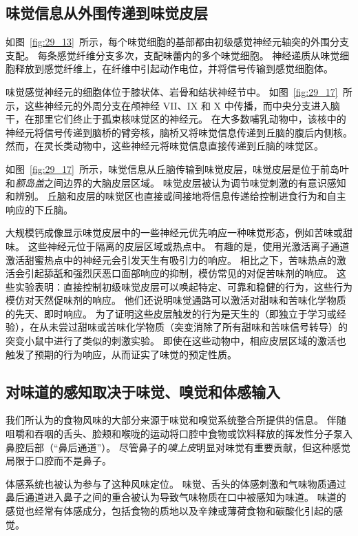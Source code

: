 \subsection{味觉信息从外围传递到味觉皮层}

如图~\ref{fig:29_13}~所示，每个味觉细胞的基部都由初级感觉神经元轴突的外围分支支配。
每条感觉纤维分支多次，支配味蕾内的多个味觉细胞。
神经递质从味觉细胞释放到感觉纤维上，在纤维中引起动作电位，并将信号传输到感觉细胞体。


味觉感觉神经元的细胞体位于膝状体、岩骨和结状神经节中。
如图~\ref{fig:29_17}~所示，这些神经元的外周分支在颅神经 VII、IX 和 X 中传播，而中央分支进入脑干，在那里它们终止于孤束核味觉区的神经元。
在大多数哺乳动物中，该核中的神经元将信号传递到脑桥的臂旁核，脑桥又将味觉信息传递到丘脑的腹后内侧核。 
然而，在灵长类动物中，这些神经元将味觉信息直接传递到丘脑的味觉区。


如图~\ref{fig:29_17}~所示，味觉信息从丘脑传输到味觉皮层，味觉皮层是位于前岛叶和\textit{额岛盖}之间边界的大脑皮层区域。
味觉皮层被认为调节味觉刺激的有意识感知和辨别。
丘脑和皮层的味觉区也直接或间接地将信息传递给控制进食行为和自主响应的下丘脑。


大规模钙成像显示味觉皮层中的一些神经元优先响应一种味觉形态，例如苦味或甜味。
这些神经元位于隔离的皮层区域或热点中。
有趣的是，使用光激活离子通道激活甜蜜热点中的神经元会引发天生有吸引力的响应。
相比之下，苦味热点的激活会引起舔舐和强烈厌恶口面部响应的抑制，模仿常见的对促苦味剂的响应。
这些实验表明：直接控制初级味觉皮层可以唤起特定、可靠和稳健的行为，这些行为模仿对天然促味剂的响应。
他们还说明味觉通路可以激活对甜味和苦味化学物质的先天、即时响应。
为了证明这些皮层触发的行为是天生的（即独立于学习或经验），在从未尝过甜味或苦味化学物质（突变消除了所有甜味和苦味信号转导）的突变小鼠中进行了类似的刺激实验。
即使在这些动物中，相应皮层区域的激活也触发了预期的行为响应，从而证实了味觉的预定性质。



\subsection{对味道的感知取决于味觉、嗅觉和体感输入}

我们所认为的食物风味的大部分来源于味觉和嗅觉系统整合所提供的信息。
伴随咀嚼和吞咽的舌头、脸颊和喉咙的运动将口腔中食物或饮料释放的挥发性分子泵入鼻腔后部（“鼻后通道”）。 
尽管鼻子的\textit{嗅上皮}明显对味觉有重要贡献，但这种感觉局限于口腔而不是鼻子。


体感系统也被认为参与了这种风味定位。
味觉、舌头的体感刺激和气味物质通过鼻后通道进入鼻子之间的重合被认为导致气味物质在口中被感知为味道。
味道的感觉也经常有体感成分，包括食物的质地以及辛辣或薄荷食物和碳酸化引起的感觉。



